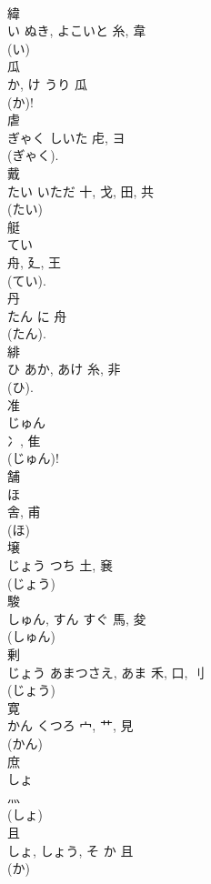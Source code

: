 \documentclass[8pt]{extreport}
\begin{document}
\begin{CJK}{UTF8}{min}
\\	緯	
\\	い	ぬき, よこいと	糸, 韋	
\\	(い) 
\\	瓜	
\\	か, け	うり	瓜	
\\	(か)! 
\\	虐	
\\	ぎゃく	しいた	虍, ヨ	
\\	(ぎゃく). 
\\	戴	
\\	たい	いただ	十, 戈, 田, 共	
\\	(たい) 
\\	艇	
\\	てい	
\\	舟, 廴, 王	
\\	(てい). 
\\	丹	
\\	たん	に	舟	
\\	(たん). 
\\	緋	
\\	ひ	あか, あけ	糸, 非	
\\	(ひ). 
\\	准	
\\	じゅん	
\\	冫, 隹	
\\	(じゅん)! 
\\	舗	
\\	ほ	
\\	舎, 甫	
\\	(ほ) 
\\	壌	
\\	じょう	つち	土, 㐮	
\\	(じょう) 
\\	駿	
\\	しゅん, すん	すぐ	馬, 夋	
\\	(しゅん) 
\\	剰	
\\	じょう	あまつさえ, あま	禾, 口, 刂	
\\	(じょう) 
\\	寛	
\\	かん	くつろ	宀, 艹, 見	
\\	(かん) 
\\	庶	
\\	しょ	
\\	灬		
\\	(しょ) 
\\	且	
\\	しょ, しょう, そ	か	且	
\\	(か) 

\end{CJK}
\end{document}
